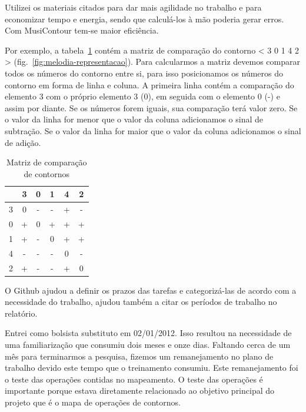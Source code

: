 \documentclass[11pt]{article}
\begin{document}
Utilizei os materiais citados para dar mais agilidade no trabalho e
para economizar tempo e energia, sendo que calculá-los à mão poderia
gerar erros. Com MusiContour tem-se maior eficiência.

Por exemplo, a tabela~\ref{tab:matriz-comparacao-contornos} contém a
matriz de comparação do contorno < 3 0 1 4 2 >
(fig.~\ref{fig:melodia-representacao}). Para calcularmos a matriz
devemos comparar todos os números do contorno entre si, para isso
posicionamos os números do contorno em forma de linha e coluna. A
primeira linha contém a comparação do elemento 3 com o próprio
elemento 3 (0), em seguida com o elemento 0 (-) e assim por diante. Se
os números forem iguais, sua comparação terá valor zero. Se o valor da
linha for menor que o valor da coluna adicionamos o sinal de
subtração. Se o valor da linha for maior que o valor da coluna
adicionamos o sinal de adição.

\begin{table}
  \centering
  \begin{tabular}{c|ccccc}
    &3&0&1&4&2\\
    \hline
    3&0&-&-&+&-\\
    0&+&0&+&+&+\\
    1&+&-&0&+&+\\
    4&-&-&-&0&-\\
    2&+&-&-&+&0\\
  \end{tabular}
  \caption{Matriz de comparação de contornos}
  \label{tab:matriz-comparacao-contornos}
\end{table}

O Github ajudou a definir os prazos das tarefas e categorizá-las de
acordo com a necessidade do trabalho, ajudou também a citar os
períodos de trabalho no relatório.

Entrei como bolsista substituto em 02/01/2012. Isso resultou na
necessidade de uma familiarização que consumiu dois meses e onze dias.
Faltando cerca de um mês para terminarmos a pesquisa, fizemos um
remanejamento no plano de trabalho devido este tempo que o treinamento
consumiu. Este remanejamento foi o teste das operações contidas no
mapeamento. O teste das operações é importante porque estava
diretamente relacionado ao objetivo principal do projeto que é o mapa
de operações de contornos.
\end{document}
